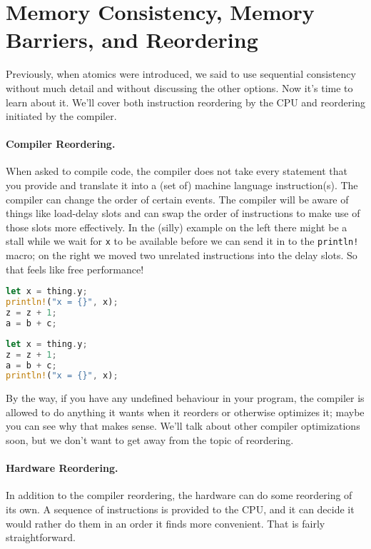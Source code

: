 




\section*{Memory Consistency, Memory Barriers, and Reordering}
Previously, when atomics were introduced, we said to use sequential consistency without much detail and without discussing the other options. Now it's time to learn about it. We'll cover both instruction reordering by
the CPU and reordering initiated by the compiler.  

\paragraph{Compiler Reordering.} When asked to compile code, the compiler does not take every statement that you provide and translate it into a (set of) machine language instruction(s). The compiler can change the order of certain events. The compiler will be aware of things like load-delay slots and can swap the order of instructions to make use of those slots more effectively. In the (silly) example on the left there might be a stall while we wait for \texttt{x} to be available before we can send it in to the \texttt{println!} macro; on the right we moved two unrelated instructions into the delay slots. So that feels like free performance! 

\begin{multicols}{2}
\begin{lstlisting}[language=Rust]
let x = thing.y;
println!("x = {}", x);
z = z + 1;
a = b + c;
\end{lstlisting}
\columnbreak
\begin{lstlisting}[language=Rust]
let x = thing.y;
z = z + 1;
a = b + c;
println!("x = {}", x);
\end{lstlisting}
\end{multicols}

By the way, if you have any undefined behaviour in your program, the compiler is allowed to do anything it wants when it reorders or otherwise optimizes it; maybe you can see why that makes sense. We'll talk about other compiler optimizations soon, but we don't want to get away from the topic of reordering. 

\paragraph{Hardware Reordering.} In addition to the compiler reordering, the hardware can do some reordering of its own. A sequence of instructions is provided to the CPU, and it can decide it would rather do them in an order it finds more convenient. That is fairly straightforward.

